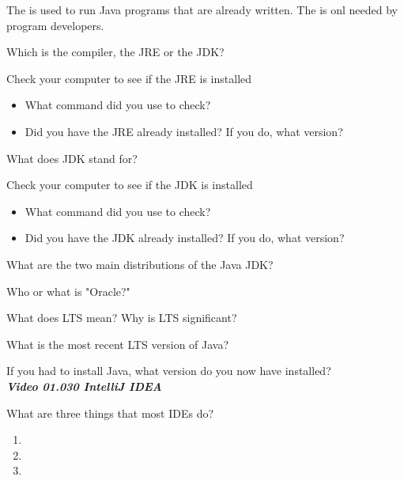 \documentclass[11pt]{exam}
\begin{document}
\begin{questions}
\question The \makebox[4em]{\hrulefill} is used to run Java programs that are already written.  The \makebox[4em]{\hrulefill} is onl needed by program developers.

\question Which is the compiler, the JRE or the JDK? \makebox[4em]{\hrulefill}

\begin{samepage}
\question Check your computer to see if the JRE is installed
\begin{itemize}
    \item What command did you use to check?
    \item Did you have the JRE already installed?  If you do, what version?
\end{itemize}
\end{samepage}

\question What does JDK stand for? 

\begin{samepage}
    \question Check your computer to see if the JDK is installed
    \begin{itemize}
        \item What command did you use to check?
        \item Did you have the JDK already installed?  If you do, what version?
    \end{itemize}
    \end{samepage}
    
 \question What are the two main distributions of the Java JDK?
 
 \question Who or what is "Oracle?"
 \vspace{1cm}

 \question What does LTS mean?  Why is LTS significant?
 \vspace{1.5cm}

 \question What is the most recent LTS version of Java?

 \question If you had to install Java, what version do you now have installed?
 \vspace{1cm}\\
 \textit{\textbf{Video 01.030 IntelliJ IDEA}}

\begin{samepage}
    \question What are three things that most IDEs do?
    
        \begin{enumerate}
         \item 
         \item 
         \item 
        \end{enumerate}
\end{samepage}


\end{questions}
\end{document}

